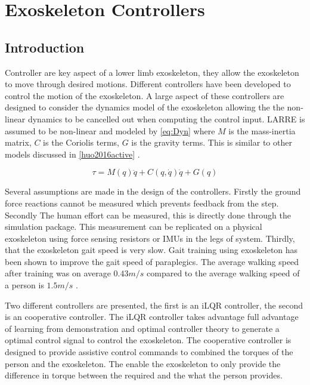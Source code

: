 \chapter{Exoskeleton Controllers}

\section{Introduction}

Controller are key aspect of a lower limb exoskeleton, they allow the exoskeleton to move through desired motions. Different controllers have been developed to control the motion of the exoskeleton. A large aspect of these controllers are designed to consider the dynamics model of the exoskeleton allowing the the non-linear dynamics to be cancelled out when computing the control input. LARRE is assumed to be non-linear and modeled by \autoref{eq:Dyn} where $M$ is the mass-inertia matrix, $C$ is the Coriolis terms, $G$ is the gravity terms. This is similar to other models discussed in \autoref{huo2016active} \cite{vantilt2019model}.

\begin{equation}
    \tau = M(q) \ddot{q} + C(q, \dot{q}) \dot{q} + G(q)
    \label{eq:Dyn}
\end{equation}


Several assumptions are made in the design of the controllers. Firstly the ground force reactions cannot be measured which prevents feedback from the step. Secondly The human effort can be measured, this is directly done through the simulation package. This measurement can be replicated on a physical exoskeleton using force sensing resistors or IMUs in the legs of system. Thirdly, that the exoskeleton gait speed is very slow. Gait training using exoskeleton has been shown to improve the gait speed of paraplegics. The average walking speed after training was on average $0.43m/s$ \cite{khan2019retraining} compared to the average walking speed of a person is $1.5m/s$ \cite{fitzpatrick2006another}. 

Two different controllers are presented, the first is an iLQR controller, the second is an cooperative controller. The iLQR controller takes advantage full advantage of learning from demonstration and optimal controller theory to generate a optimal control signal to control the exoskeleton. The cooperative controller is designed to provide assistive control commands to combined the torques of the person and the exoskeleton. The enable the exoskeleton to only provide the difference in torque between the required and the what the person provides. 

